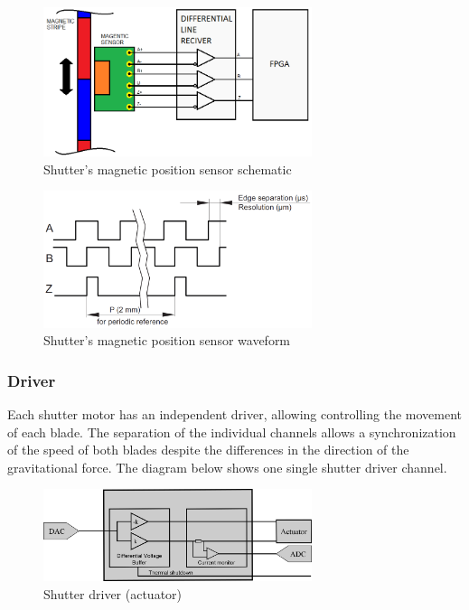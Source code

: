 \begin{figure}[H]
\centering
\includegraphics[width=0.7\textwidth]{pict/shut_sens_magnetic.png}
\caption{Shutter's magnetic position sensor schematic}
\label{fig:shut_mag_sens_sch}
\end{figure}

\begin{figure}[H]
\centering
\includegraphics[width=0.7\textwidth]{pict/shut_sens_magnetic_waveform.png}
\caption{Shutter's magnetic position sensor waveform}
\label{fig:shut_mag_sens_wave}
\end{figure}

\subsubsection{Driver}
Each shutter motor has an independent driver, allowing controlling the movement of each blade. The separation of the individual channels allows a synchronization of the speed of both blades despite the differences in the direction of the gravitational force. The diagram below shows one single shutter driver channel.

\begin{figure}[H]
\centering
\includegraphics[width=0.7\textwidth]{pict/shut_drv.png}
\caption{Shutter driver (actuator)}
\label{fig:shutdrv}
\end{figure}

